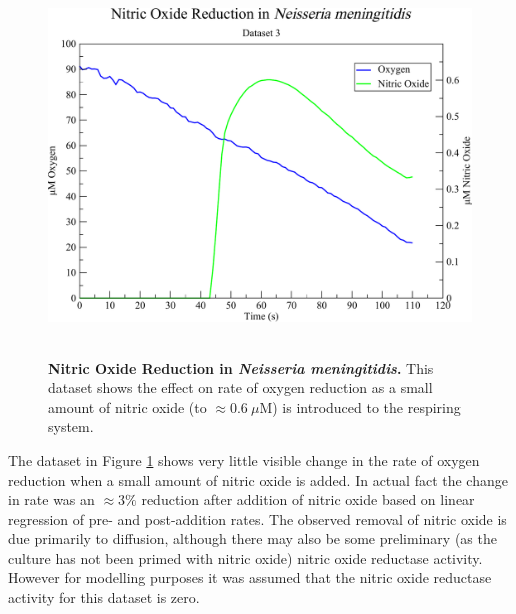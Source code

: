 \begin{figure}[tbp]
 \centering
 \includegraphics[height=10cm, clip=true]{./06-noreduction/data/aer-no-data1.pdf}
 \caption[{Nitric Oxide Reduction in \textit{Neisseria meningitidis}.}]{{\bf Nitric Oxide Reduction in \textit{Neisseria meningitidis}.} This dataset shows the effect on rate of oxygen reduction as a small amount of nitric oxide (to $\approx 0.6~\mu \mathrm{M}$) is introduced to the respiring system.}
 \label{fig:nodata1}
\end{figure}
The dataset in Figure \ref{fig:nodata1} shows very little visible change in the rate of oxygen reduction when a small amount of nitric oxide is added. In actual fact the change in rate was an $\approx 3\%$ reduction after addition of nitric oxide based on linear regression of pre- and post-addition rates. The observed removal of nitric oxide is due primarily to diffusion, although there may also be some preliminary (as the culture has not been primed with nitric oxide) nitric oxide reductase activity. However for modelling purposes it was assumed that the nitric oxide reductase activity for this dataset is zero.

